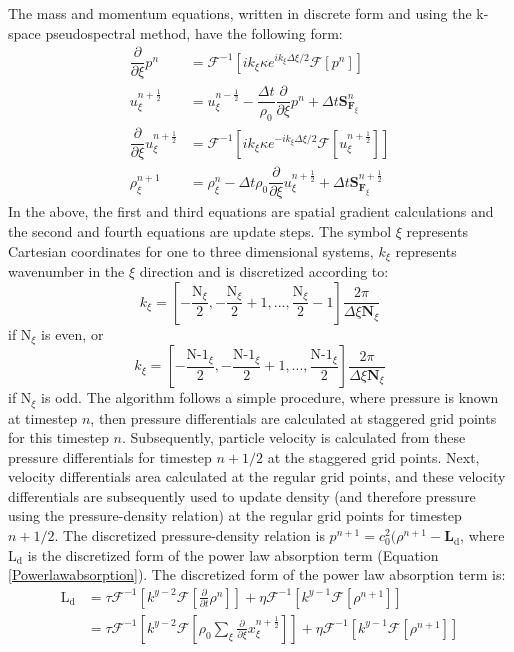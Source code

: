 \documentclass[10pt,a4paper]{article}
\begin{document}
The mass and momentum equations, written in discrete form and using the k-space pseudospectral method, have the following form:
\begin{align}
\dfrac{\partial}{\partial \xi} p^n &= \mathcal{F}^{-1} \left[ i k_{\xi} \kappa e^{ i k_{\xi} \Delta \xi /2} \mathcal{F} \left[ p^n \right] \right] \\
u_{\xi}^{n+\frac{1}{2}} &= u_{\xi}^{n-\frac{1}{2}} - \dfrac{\Delta t}{\rho_0} \dfrac{\partial}{\partial \xi} p^n + \Delta t \textbf{S}_{\textbf{F}_{\xi}}^n\\
\dfrac{\partial}{\partial \xi} u_{\xi}^{n+\frac{1}{2}} &= \mathcal{F}^{-1} \left[ i k_{\xi} \kappa e^{-ik_{\xi} \Delta \xi / 2} \mathcal{F} \left[ u_{\xi}^{n+\frac{1}{2}} \right] \right]\\
\rho_{\xi}^{n+1} &= \rho_{\xi}^n - \Delta t \rho_0 \dfrac{\partial}{\partial \xi} u_{\xi}^{n+\frac{1}{2}} + \Delta t  \textbf{S}_{\textbf{F}_{\xi}}^{n+\frac{1}{2}}
\end{align}
In the above, the first and third equations are spatial gradient calculations and the second and fourth equations are update steps. The symbol $\xi$ represents Cartesian coordinates for one to three dimensional systems, $k_{\xi}$ represents wavenumber in the $\xi$ direction and is discretized according to: 
\begin{equation}
k_{\xi} = \left[-\dfrac{\text{N}_{\xi}}{2}, -\dfrac{\text{N}_{\xi}}{2}+1, ... , \dfrac{\text{N}_{\xi}}{2} -1 \right] \dfrac{2\pi}{\Delta \xi \textbf{N}_{\xi}}
\end{equation}
if N$_{\xi}$ is even, or 
\begin{equation}
k_{\xi} = \left[-\dfrac{\text{N-1}_{\xi}}{2}, -\dfrac{\text{N-1}_{\xi}}{2}+1, ... , \dfrac{\text{N-1}_{\xi}}{2} \right] \dfrac{2\pi}{\Delta \xi \textbf{N}_{\xi}}
\end{equation}
if N$_{\xi}$ is odd. The algorithm follows a simple procedure, where pressure is known at timestep $n$, then pressure differentials are calculated at staggered grid points for this timestep $n$. Subsequently, particle velocity is calculated from these pressure differentials for timestep $n+1/2$ at the staggered grid points. Next, velocity differentials area calculated at the regular grid points, and these velocity differentials are subsequently used to update density (and therefore pressure using the pressure-density relation) at the regular grid points for timestep $n+1/2$. The discretized pressure-density relation is $p^{n+1} = c_0^2(\rho^{n+1} - \textbf{L}_{\text{d}}$, where L$_{\text{d}}$ is the discretized form of the power law absorption term (Equation \ref{Powerlawabsorption}). The discretized form of the power law absorption term is:
\begin{align}
\text{L}_{\text{d}} &= \tau \mathcal{F}^{-1} \left[k^{y-2} \mathcal{F} \left[\frac{\partial}{\partial t} \rho^n \right] \right] + \eta \mathcal{F}^{-1} \left[ k^{y-1} \mathcal{F}\left[\rho^{n+1}\right] \right]\\
&= \tau \mathcal{F}^{-1} \left[k^{y-2} \mathcal{F} \left[\rho_0 \sum_{\xi} \frac{\partial}{\partial \xi} x_{\xi}^{n+\frac{1}{2}} \right] \right] + \eta \mathcal{F}^{-1} \left[ k^{y-1} \mathcal{F}\left[\rho^{n+1}\right] \right]
\end{align}
\end{document}
